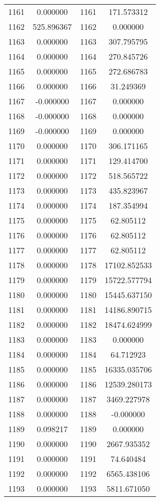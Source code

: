 \documentclass[12pt]{article}
\begin{document}
\begin{longtable}{@{}cccc@{}}
1161 & 0.000000 & 1161 & 171.573312 \\
1162 & 525.896367 & 1162 & 0.000000 \\
1163 & 0.000000 & 1163 & 307.795795 \\
1164 & 0.000000 & 1164 & 270.845726 \\
1165 & 0.000000 & 1165 & 272.686783 \\
1166 & 0.000000 & 1166 & 31.249369 \\
1167 & -0.000000 & 1167 & 0.000000 \\
1168 & -0.000000 & 1168 & 0.000000 \\
1169 & -0.000000 & 1169 & 0.000000 \\
1170 & 0.000000 & 1170 & 306.171165 \\
1171 & 0.000000 & 1171 & 129.414700 \\
1172 & 0.000000 & 1172 & 518.565722 \\
1173 & 0.000000 & 1173 & 435.823967 \\
1174 & 0.000000 & 1174 & 187.354994 \\
1175 & 0.000000 & 1175 & 62.805112 \\
1176 & 0.000000 & 1176 & 62.805112 \\
1177 & 0.000000 & 1177 & 62.805112 \\
1178 & 0.000000 & 1178 & 17102.852533 \\
1179 & 0.000000 & 1179 & 15722.577794 \\
1180 & 0.000000 & 1180 & 15445.637150 \\
1181 & 0.000000 & 1181 & 14186.890715 \\
1182 & 0.000000 & 1182 & 18474.624999 \\
1183 & 0.000000 & 1183 & 0.000000 \\
1184 & 0.000000 & 1184 & 64.712923 \\
1185 & 0.000000 & 1185 & 16335.035706 \\
1186 & 0.000000 & 1186 & 12539.280173 \\
1187 & 0.000000 & 1187 & 3469.227978 \\
1188 & 0.000000 & 1188 & -0.000000 \\
1189 & 0.098217 & 1189 & 0.000000 \\
1190 & 0.000000 & 1190 & 2667.935352 \\
1191 & 0.000000 & 1191 & 74.640484 \\
1192 & 0.000000 & 1192 & 6565.438106 \\
1193 & 0.000000 & 1193 & 5811.671050 \\

\end{longtable}
\end{document}
